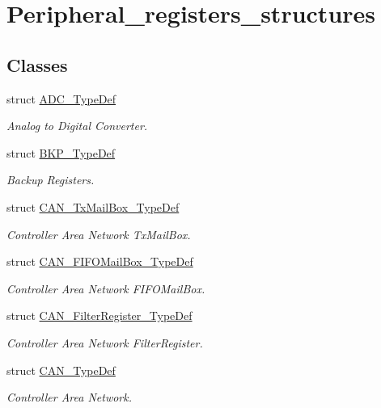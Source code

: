 \hypertarget{group___peripheral__registers__structures}{\section{Peripheral\-\_\-registers\-\_\-structures}
\label{group___peripheral__registers__structures}
}
\subsection*{Classes}
\begin{DoxyCompactItemize}
\item 
struct \hyperlink{struct_a_d_c___type_def}{A\-D\-C\-\_\-\-Type\-Def}
\begin{DoxyCompactList}\small\item\em Analog to Digital Converter. \end{DoxyCompactList}\item 
struct \hyperlink{struct_b_k_p___type_def}{B\-K\-P\-\_\-\-Type\-Def}
\begin{DoxyCompactList}\small\item\em Backup Registers. \end{DoxyCompactList}\item 
struct \hyperlink{struct_c_a_n___tx_mail_box___type_def}{C\-A\-N\-\_\-\-Tx\-Mail\-Box\-\_\-\-Type\-Def}
\begin{DoxyCompactList}\small\item\em Controller Area Network Tx\-Mail\-Box. \end{DoxyCompactList}\item 
struct \hyperlink{struct_c_a_n___f_i_f_o_mail_box___type_def}{C\-A\-N\-\_\-\-F\-I\-F\-O\-Mail\-Box\-\_\-\-Type\-Def}
\begin{DoxyCompactList}\small\item\em Controller Area Network F\-I\-F\-O\-Mail\-Box. \end{DoxyCompactList}\item 
struct \hyperlink{struct_c_a_n___filter_register___type_def}{C\-A\-N\-\_\-\-Filter\-Register\-\_\-\-Type\-Def}
\begin{DoxyCompactList}\small\item\em Controller Area Network Filter\-Register. \end{DoxyCompactList}\item 
struct \hyperlink{struct_c_a_n___type_def}{C\-A\-N\-\_\-\-Type\-Def}
\begin{DoxyCompactList}\small\item\em Controller Area Network. \end{DoxyCompactList}\item 

\end{DoxyCompactItemize}
